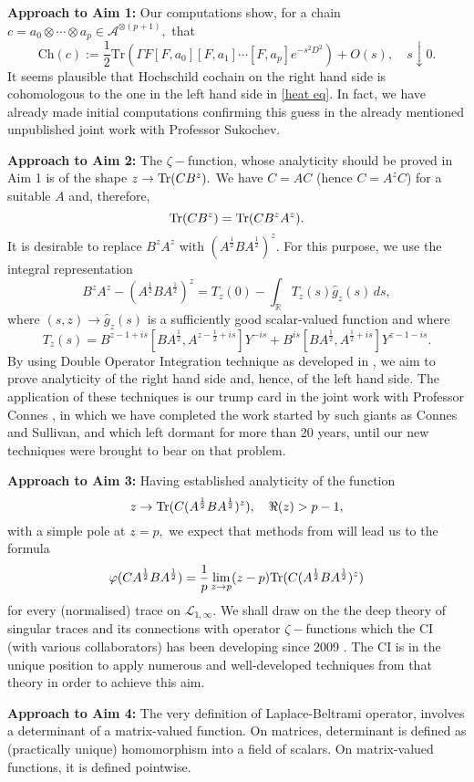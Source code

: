\documentclass[12pt]{article}
\begin{document}
{\bf Approach to Aim 1:} Our computations show, for a chain $c=a_0\otimes\cdots\otimes a_p\in\mathcal{A}^{\otimes (p+1)},$ that
$$\mathrm{Ch}(c) := \frac{1}{2}\mathrm{Tr}(\Gamma F[F,a_0][F,a_1]\cdots[F,a_p]e^{-s^2D^2})+O(s),\quad s\downarrow 0.$$
It seems plausible that Hochschild cochain on the right hand side is cohomologous to the one in the left hand side in \eqref{heat eq}. In fact, we have already made initial computations confirming this guess in the already mentioned unpublished joint work with Professor Sukochev.

{\bf Approach to Aim 2:} The $\zeta-$function, whose analyticity should be proved in Aim 1 is of the shape $z\to {\rm Tr}(CB^z).$ We have $C=AC$ (hence $C=A^zC$) for a suitable $A$ and, therefore,
$${\rm Tr}(CB^z)={\rm Tr}(CB^zA^z).$$
It is desirable to replace $B^zA^z$ with $(A^{\frac12}BA^{\frac12})^z.$ For this purpose, we use the integral representation
$$B^zA^z-(A^{\frac{1}{2}}BA^{\frac{1}{2}})^z = T_z(0)-\int_{\mathbb{R}} T_z(s)\widehat{g}_z(s)\,ds,$$ 
where $(s,z)\to\widehat{g}_z(s)$ is a sufficiently good scalar-valued function and where
$$T_z(s)= B^{z-1+is}[BA^{\frac{1}{2}},A^{z-\frac{1}{2}+is}]Y^{-is}+B^{is}[BA^{\frac{1}{2}},A^{\frac{1}{2}+is}]Y^{z-1-is}.$$
By using Double Operator Integration technique as developed in \cite{PotapovSukochev}, we aim to prove analyticity of the right hand side and, hence, of the left hand side. The application of these techniques is our trump card in the joint work with Professor Connes \cite{Connes_team}, in which we have completed the work started by such giants as Connes and Sullivan, and which left dormant for more than 20 years, until our new techniques were brought to bear on that problem.


{\bf Approach to Aim 3:} Having established analyticity of the function
$$z\to {\rm Tr}(C(A^{\frac12}BA^{\frac12})^z),\quad \Re(z)>p-1,$$
with a simple pole at $z=p,$ we expect that methods from \cite{SUZ-indiana} will lead us to the formula
$$\varphi(CA^{\frac12}BA^{\frac12})=\frac1p\lim_{z\to p}(z-p){\rm Tr}(C(A^{\frac12}BA^{\frac12})^z)$$
for every (normalised) trace on $\mathcal{L}_{1,\infty}.$ We shall draw on the the deep theory of singular traces and its connections with operator $\zeta-$functions which the CI (with various collaborators) has been developing since 2009 \cite{book,SUZ-indiana}. The CI is in the unique position to apply numerous and well-developed techniques from that theory in order to achieve this aim.

{\bf Approach to Aim 4:} The very definition of Laplace-Beltrami operator, involves a determinant of a matrix-valued function. On matrices, determinant is defined as (practically unique) homomorphism into a field of scalars. On matrix-valued functions, it is defined pointwise.
\end{document}
